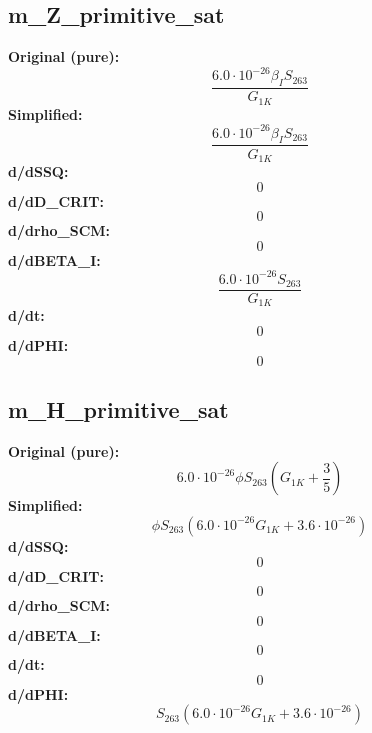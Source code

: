 \subsection{m_Z_primitive_sat}
\textbf{Original (pure):}
\begin{equation}
\frac{6.0 \cdot 10^{-26} \beta_{I} S_{26 3}}{G_{1 K}}
\end{equation}
\textbf{Simplified:}
\begin{equation}
\frac{6.0 \cdot 10^{-26} \beta_{I} S_{26 3}}{G_{1 K}}
\end{equation}
\textbf{d/dSSQ:}
\begin{equation}
0
\end{equation}
\textbf{d/dD_CRIT:}
\begin{equation}
0
\end{equation}
\textbf{d/drho_SCM:}
\begin{equation}
0
\end{equation}
\textbf{d/dBETA_I:}
\begin{equation}
\frac{6.0 \cdot 10^{-26} S_{26 3}}{G_{1 K}}
\end{equation}
\textbf{d/dt:}
\begin{equation}
0
\end{equation}
\textbf{d/dPHI:}
\begin{equation}
0
\end{equation}

\subsection{m_H_primitive_sat}
\textbf{Original (pure):}
\begin{equation}
6.0 \cdot 10^{-26} \phi S_{26 3} \left(G_{1 K} + \frac{3}{5}\right)
\end{equation}
\textbf{Simplified:}
\begin{equation}
\phi S_{26 3} \left(6.0 \cdot 10^{-26} G_{1 K} + 3.6 \cdot 10^{-26}\right)
\end{equation}
\textbf{d/dSSQ:}
\begin{equation}
0
\end{equation}
\textbf{d/dD_CRIT:}
\begin{equation}
0
\end{equation}
\textbf{d/drho_SCM:}
\begin{equation}
0
\end{equation}
\textbf{d/dBETA_I:}
\begin{equation}
0
\end{equation}
\textbf{d/dt:}
\begin{equation}
0
\end{equation}
\textbf{d/dPHI:}
\begin{equation}
S_{26 3} \left(6.0 \cdot 10^{-26} G_{1 K} + 3.6 \cdot 10^{-26}\right)
\end{equation}

